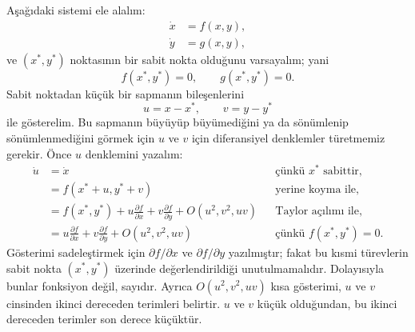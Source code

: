 \begin{justify}
Aşağıdaki sistemi ele alalım:
\begin{align}
\dot{x} &= f(x,y),\\
\dot{y} &= g(x,y),
\end{align}
ve $(x^{*},y^{*})$ noktasının bir sabit nokta olduğunu varsayalım; yani
\begin{equation}
f(x^{*},y^{*})=0, \qquad g(x^{*},y^{*})=0.
\end{equation}
Sabit noktadan küçük bir sapmanın bileşenlerini
\begin{equation}
u=x-x^{*}, \qquad v=y-y^{*}
\end{equation}
ile gösterelim. Bu sapmanın büyüyüp büyümediğini ya da sönümlenip sönümlenmediğini görmek için $u$ ve $v$ için diferansiyel denklemler türetmemiz gerekir. Önce $u$ denklemini yazalım:
\begin{align}
\dot{u} &= \dot{x} && \text{çünkü } x^{*}\text{ sabittir},\\
&= f(x^{*}+u,y^{*}+v) && \text{yerine koyma ile},\\
&= f(x^{*},y^{*})+u\frac{\partial f}{\partial x}+v\frac{\partial f}{\partial y}+O(u^2,v^2,uv) && \text{Taylor açılımı ile},\\
&= u\frac{\partial f}{\partial x}+v\frac{\partial f}{\partial y}+O(u^2,v^2,uv) && \text{çünkü } f(x^{*},y^{*})=0.
\end{align}
Gösterimi sadeleştirmek için $\partial f/\partial x$ ve $\partial f/\partial y$ yazılmıştır; fakat bu kısmi türevlerin sabit nokta $(x^{*},y^{*})$ üzerinde değerlendirildiği unutulmamalıdır. Dolayısıyla bunlar fonksiyon değil, sayıdır. Ayrıca $O(u^2,v^2,uv)$ kısa gösterimi, $u$ ve $v$ cinsinden ikinci dereceden terimleri belirtir. $u$ ve $v$ küçük olduğundan, bu ikinci dereceden terimler son derece küçüktür.


\end{justify}
